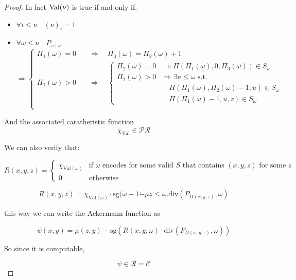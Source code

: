 \begin{theorem}
\begin{proof}
    In fact $\text{Val}(\nu)$ is true if and only if:
    \begin{itemize}
    \item \(\forall i \leq \nu \quad (\nu)_i = 1\)
    \item{
        \( \forall \omega \leq \nu \quad P_{\omega \; | \; \nu}\) \\
        \[\Rightarrow \begin{cases}
            \Pi_1(\omega) = 0 \quad & \Rightarrow
            \quad \Pi_3(\omega) = \Pi_2(\omega) + 1 \\
            \Pi_1(\omega) > 0 \quad & \Rightarrow \quad
            \begin{cases}
              \Pi_2(\omega) = 0 & \Rightarrow
              \Pi(\Pi_1(\omega),0,\Pi_3(\omega)) \in S_\nu \\
              \Pi_2(\omega) > 0 & \Rightarrow
              \exists u \leq \omega \text{ s.t. } \\
              & \quad \Pi(\Pi_1(\omega), \Pi_2(\omega)-1,u) \in S_\omega \\
              & \quad \Pi(\Pi_1(\omega)-1, u,z) \in S_\omega 
            \end{cases}
            \\
          \end{cases}
        \]
      }
    \end{itemize}

    And the associated caratheristic function
    \[\chi_{\text{Val}} \in \mathcal{PR}\]

    We can also verify that:

    \[
      R(x,y,z) = \begin{cases}

        \chi_{\text{Val}(\omega)} & \text{if $\omega$ encodes for some
          valid $S$ that contains $(x,y,z)$ for some $z$} \\

        0 & \text{otherwise}
        
      \end{cases}
    \]

    \[
      R(x,y,z) = \chi_{\text{Val}(\omega)} \cdot \text{sg} (\omega + 1
      \dot{-} \mu z \leq \omega . \text{div}(P_{\Pi(x,y,z)}, \omega)
    \]

    this way we can write the Ackermann function as

    \[
      \psi(x,y) = \mu (z,y) \; \cdot \; \overline{\text{sg}}(R(x,y,\omega)
      \cdot \text{div}(P_{\Pi(x,y,z)}, \omega))
    \]

    So since it is computable,

    \[
      \psi \in \mathcal{R} = \mathcal{C}
    \]

  \end{proof}
\end{theorem}


